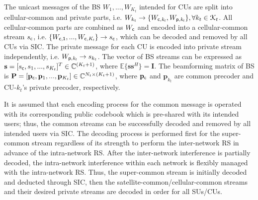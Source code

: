 \documentclass[draftclsnofoot, onecolumn, comsoc, 12pt]{IEEEtran}
\begin{document}
{The unicast messages of the BS $W_{1},...,W_{K_{t}}$ intended for CUs are split into cellular-common and private parts, i.e. $W_{k_{t}} \rightarrow \{W_{\sf{c},\it{k_{t}}}, W_{\sf{p},\it{k_{t}}}\}, \forall k_{t}\in\mathcal{K}_{t}$. 
All cellular-common parts are combined as $W_{\sf{c}}$ and encoded into a cellular-common stream $s_{\sf{c}}$, i.e. $\{W_{\sf{c},1},...,W_{\sf{c},\it{K_{t}}}\} \rightarrow s_{\sf{c}}$, which can be decoded and removed by all CUs via SIC.} 
The private message for each CU is encoded into private stream independently, i.e. $W_{\sf{p}, \it{k_{t}}} \rightarrow s_{k_{t}}$. 
The vector of BS streams can be expressed as 
$\mathbf{s}=[s_{\sf{c}},s_{1},...,s_{K_{t}}]^{T}\in\mathbb{C}^{(K_{t}+1)}$, where $\mathbb{E}\{\mathbf{s}\mathbf{s}^{H}\}=\mathbf{I}$.
The beamforming matrix of BS is $\mathbf{P} = [\mathbf{p}_{\sf{c}},\mathbf{p}_{1},...,\mathbf{p}_{K_{t}}]\in\mathbb{C}^{{N_{t}} \times (K_{t}+1)}$, where $\mathbf{p}_{\sf{c}}$ and $\mathbf{p}_{k_{t}}$ are common precoder and CU-$k_{t}$'s private precoder, respectively.

{It is assumed that each encoding process for the common message is operated with its corresponding public codebook which is pre-shared with its intended users; thus, the common streams can be successfully decoded and removed by all intended users via SIC. 
%
The decoding process is performed first for the super-common stream regardless of its strength to perform the inter-network RS in advance of the intra-network RS. 
After the inter-network interference is partially decoded, the intra-network interference within each network is flexibly managed with the intra-network RS.
}
Thus, the super-common stream is initially decoded and deducted through SIC, then the satellite-common/cellular-common streams and their desired private streams are decoded in order for all SUs/CUs.
\end{document}
